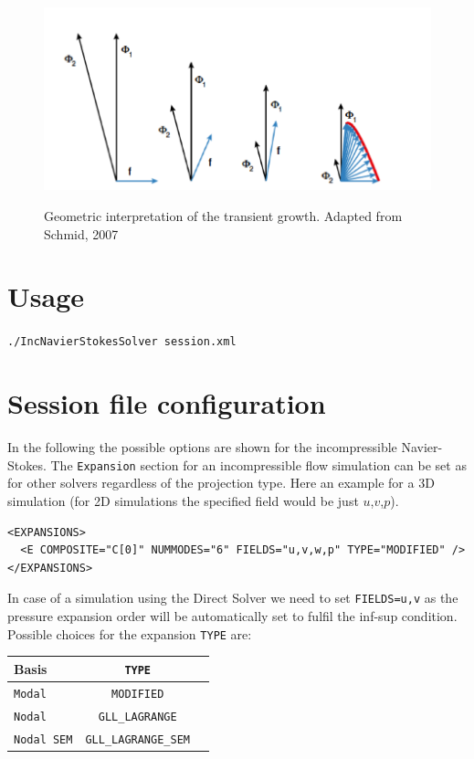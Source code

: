 \begin{figure}[!htbp]
\centering
 \label{TG}
 {\includegraphics[width=1 \textwidth]{Figures/transient_growth.png}}
   \caption {Geometric interpretation of the transient growth. Adapted from Schmid, 2007 }
\end{figure}


\section{Usage}

\texttt{./IncNavierStokesSolver session.xml}

\section{Session file configuration}

In the following the possible options are shown for the incompressible Navier-Stokes. The \texttt{Expansion} section for an incompressible flow simulation can be set as for other solvers regardless of the projection type. Here an example for a 3D simulation (for 2D simulations the specified field would be just $u$,$v$,$p$).

\begin{lstlisting}[style=XMLStyle]
<EXPANSIONS>
  <E COMPOSITE="C[0]" NUMMODES="6" FIELDS="u,v,w,p" TYPE="MODIFIED" />
</EXPANSIONS>
\end{lstlisting}

In case of a simulation using the Direct Solver we need to set \texttt{FIELDS=u,v} as the pressure expansion order will be automatically set to fulfil the inf-sup condition.
Possible choices for the expansion \texttt{TYPE} are:

\begin{table}
\begin{center}
\begin{tabular}{|l|c|c|} \hline
{Basis} & {\texttt{TYPE}} \\ \hline
\texttt{Modal} & \texttt{MODIFIED} \\ \hline
\texttt{Nodal} & \texttt{GLL\_LAGRANGE} \\ \hline
\texttt{Nodal SEM} & \texttt{GLL\_LAGRANGE\_SEM} \\ \hline
\end{tabular}
\end{center}
\end{table}

